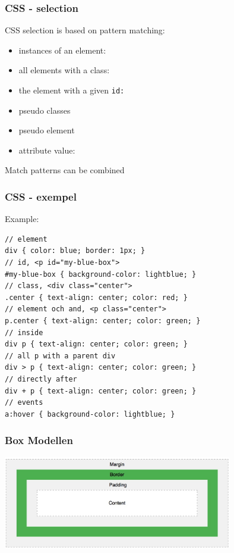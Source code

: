 \begin{frame}[fragile]
\frametitle{CSS - selection}
\color{structure}
CSS selection is based on pattern matching:\\
\begin{itemize}\color{structure}
\item instances of an element: 
\item all elements with a class: 
\item the element with a given \tt{id}: 
\item pseudo classes 
\item pseudo element  
\item attribute value:  
\end{itemize}
Match patterns can be combined
\end{frame}

\begin{frame}[fragile]
\frametitle{CSS - exempel}
\color{structure}
Example:
\begin{lstlisting}[style=htmlcssjs]
// element
div { color: blue; border: 1px; }
// id, <p id="my-blue-box">
#my-blue-box { background-color: lightblue; }
// class, <div class="center">
.center { text-align: center; color: red; }
// element och and, <p class="center">
p.center { text-align: center; color: green; }
// inside
div p { text-align: center; color: green; }
// all p with a parent div
div > p { text-align: center; color: green; }
// directly after
div + p { text-align: center; color: green; }
// events
a:hover { background-color: lightblue; }
\end{lstlisting}
\end{frame}

\begin{frame}[fragile]
\frametitle{Box Modellen}
\color{structure}
  \centering
  \includegraphics[width=10cm]{img/box_model}

\end{frame}

